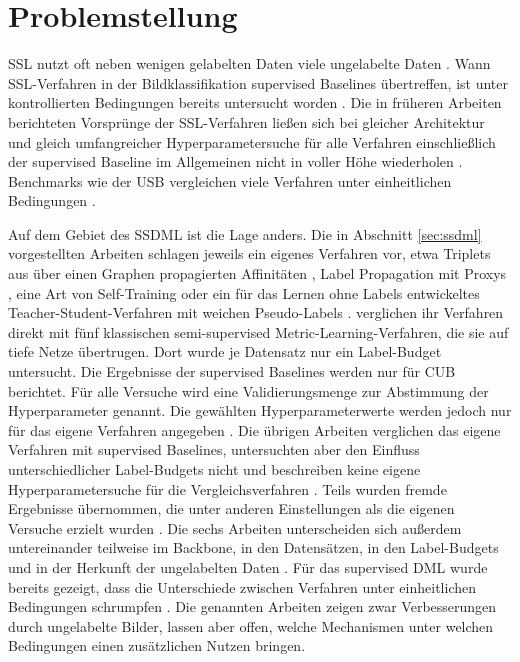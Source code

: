 \section{Problemstellung}

\ac{SSL} nutzt oft neben wenigen gelabelten Daten viele ungelabelte Daten \cite{van_engelen_survey_2019}. Wann \ac{SSL}-Verfahren in der Bildklassifikation supervised Baselines übertreffen, ist unter kontrollierten Bedingungen bereits untersucht worden \cite{oliver_realistic_2018, su_realistic_2021, wang_usb_2022, zhang_revisiting_2025}. Die in früheren Arbeiten berichteten Vorsprünge der \ac{SSL}-Verfahren ließen sich bei gleicher Architektur und gleich umfangreicher Hyperparametersuche für alle Verfahren einschließlich der supervised Baseline im Allgemeinen nicht in voller Höhe wiederholen \cite{oliver_realistic_2018}. Benchmarks wie der \ac{USB} vergleichen viele Verfahren unter einheitlichen Bedingungen \cite{wang_usb_2022}.

Auf dem Gebiet des \ac{SSDML} ist die Lage anders. Die in Abschnitt \ref{sec:ssdml} vorgestellten Arbeiten schlagen jeweils ein eigenes Verfahren vor, etwa Triplets aus über einen Graphen propagierten Affinitäten \cite{dutta_semi-supervised_2021}, Label Propagation mit Proxys \cite{zhuang_deep_2021, zhuang_deep_2023}, eine Art von Self-Training \cite{duan_slade_2021, sahito_semi-supervised_2021} oder ein für das Lernen ohne Labels entwickeltes Teacher-Student-Verfahren mit weichen Pseudo-Labels \cite{kim_self-taught_2022}. \textcite{dutta_semi-supervised_2021} verglichen ihr Verfahren direkt mit fünf klassischen semi-supervised Metric-Learning-Verfahren, die sie auf tiefe Netze übertrugen. Dort wurde je Datensatz nur ein Label-Budget untersucht. Die Ergebnisse der supervised Baselines werden nur für \ac{CUB} berichtet. Für alle Versuche wird eine Validierungsmenge zur Abstimmung der Hyperparameter genannt. Die gewählten Hyperparameterwerte werden jedoch nur für das eigene Verfahren angegeben \cite{dutta_semi-supervised_2021}. Die übrigen Arbeiten verglichen das eigene Verfahren mit supervised Baselines, untersuchten aber den Einfluss unterschiedlicher Label-Budgets nicht und beschreiben keine eigene Hyperparametersuche für die Vergleichsverfahren \cite{zhuang_deep_2021, zhuang_deep_2023, duan_slade_2021, kim_self-taught_2022, sahito_semi-supervised_2021}. Teils wurden fremde Ergebnisse übernommen, die unter anderen Einstellungen als die eigenen Versuche erzielt wurden \cite{duan_slade_2021, zhuang_deep_2023}. Die sechs Arbeiten unterscheiden sich außerdem untereinander teilweise im Backbone, in den Datensätzen, in den Label-Budgets und in der Herkunft der ungelabelten Daten \cite{dutta_semi-supervised_2021, zhuang_deep_2021, zhuang_deep_2023, duan_slade_2021, kim_self-taught_2022, sahito_semi-supervised_2021}. Für das supervised \ac{DML} wurde bereits gezeigt, dass die Unterschiede zwischen Verfahren unter einheitlichen Bedingungen schrumpfen \cite{musgrave_metric_2020}. Die genannten Arbeiten zeigen zwar Verbesserungen durch ungelabelte Bilder, lassen aber offen, welche Mechanismen unter welchen Bedingungen einen zusätzlichen Nutzen bringen.

